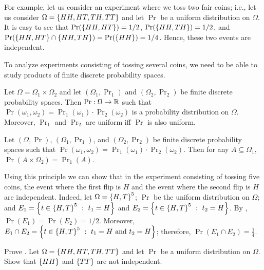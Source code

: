 For example, let us consider an experiment where we toss two fair coins; i.e.,
let us consider $\Omega = \set{HH, HT, TH, TT}$ and let $\Pr$ be a uniform
distribution on $\Omega$. It is easy to see that $\Pr(\set{HH, HT}) = 1 / 2$,
$\Pr(\set{HH, TH}) = 1 / 2$, and $\Pr(\set{HH, HT} \cap \set{HH, TH}) =
\Pr(\set{HH}) =  1 / 4$. Hence, these two events are independent.

To analyze experiments consisting of tossing several coins, we need to be able
to study products of finite discrete probability spaces.
\begin{theorem}
  Let $\Omega = \Omega_1 \times \Omega_2$ and let $(\Omega_1, \Pr_1)$ and
  $(\Omega_2, \Pr_2)$ be finite discrete probability spaces. Then $\Pr : \Omega
  \to {\mathbb{R}}$ such that $\Pr(\omega_1, \omega_2) = \Pr_1(\omega_1) \cdot
  \Pr_2(\omega_2)$ is a probability distribution on $\Omega$.
  Moreover, $\Pr_1$ and $\Pr_2$ are uniform iff $\Pr$ is also uniform.
\end{theorem}

\begin{corollary}
\label{corollary:multiplicative-principle-probability}
   Let $(\Omega, \Pr)$, $(\Omega_1, \Pr_1)$, and $(\Omega_2, \Pr_2)$ be finite
   discrete probability spaces such that $\Pr(\omega_1, \omega_2) = 
   \Pr_1(\omega_1) \cdot \Pr_2(\omega_2)$. Then for any $A \subseteq \Omega_1$, 
   $\Pr(A \times \Omega_2) = \Pr_1(A)$.
\end{corollary}

Using this principle we can show that in the experiment consisting of tossing
five coins, the event where the first flip is $H$ and the event where the second
flip is $H$ are independent. Indeed, let $\Omega = \set{H, T}^5$; $\Pr$
be the uniform distribution on $\Omega$; and 
$E_1 = \set[t_1 = H]{t \in \set{H, T}^5}$ and
$E_2 = \set[t_2 = H]{t \in \set{H, T}^5}$. By
,
$\Pr(E_1) = \Pr(E_2) = 1 / 2$. Moreover, 
$E_1 \cap E_2 = \set[t_1 = H \text{ and } t_2 = H]{t \in \set{H, T}^5}$;
therefore, $\Pr(E_1 \cap E_2) = \frac{1}{4}$.

\begin{chapterendexercises}
  \exercise Prove .
  \exercise Let $\Omega = \set{HH, HT, TH, TT}$ and let $\Pr$ be a uniform
    distribution on $\Omega$. Show that $\set{HH}$ and $\set{TT}$ are not
    independent.
\end{chapterendexercises}
